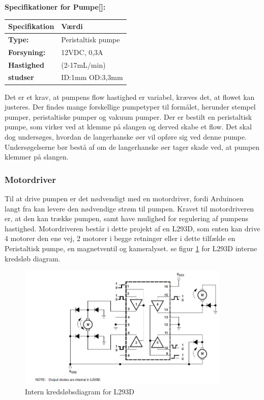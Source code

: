 \textbf{Specifikationer for Pumpe[\citet{DH8}]:} 
\begin{center}
		\begin{longtable}{ | m{6.5cm} | m{6.5cm}| } 
			\hline
			\textbf{Specifikation} &\textbf{Værdi} \\ 
			\hline
			\textbf{Type:} & Peristaltisk pumpe \\ 
			\hline
			\textbf{Forsyning:} & 12VDC, 0,3A  \\ 
			\hline
			\textbf{Hastighed} & (2-17mL/min) \\ 
			\hline		
			\textbf{studser} & ID:1mm OD:3,3mm  \\ 
			\hline	
		\end{longtable}
\end{center}

Det er et krav, at pumpens flow hastighed er variabel, kræves det, at flowet kan justeres. Der findes mange forskellige pumpetyper til formålet, herunder stempel pumper, peristaltiske pumper og vakuum pumper. Der er bestilt en peristaltisk pumpe, som virker ved at klemme på slangen og derved skabe et flow. Det skal dog undersøges, hvordan de langerhanske øer vil opføre sig ved denne pumpe. Undersøgelserne bør bestå af om de langerhanske øer tager skade ved, at pumpen klemmer på slangen.

\subsubsection{Motordriver}
Til at drive pumpen er det nødvendigt med en motordriver, fordi Arduinoen langt fra kan levere den nødvendige strøm til pumpen. Kravet til motordriveren er, at den kan trække pumpen, samt have mulighed for regulering af pumpens hastighed.
Motordriveren består i dette projekt af en L293D, som enten kan drive 4 motorer den ene vej, 2 motorer i begge retninger eller i dette tilfælde en Peristaltisk pumpe, en magnetventil og kameralyset. se figur \ref{fig:L293DInterndiagram} for L293D interne kredsløb diagram. 
 
   \begin{figure}[H]
	\centering
	\includegraphics[width=0.9\textwidth]{billeder/Hardware/diagrammer/L293intern.JPG}
	\caption{Intern kredsløbsdiagram for L293D}
	\label{fig:L293DInterndiagram}
\end{figure}

